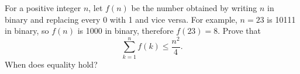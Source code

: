 For a positive integer \(n\), let \(f(n)\) be the number obtained by
writing \(n\) in binary and replacing every 0 with 1 and vice
versa. For example, \(n=23\) is 10111 in binary, so \(f(n)\) is 1000 in
binary, therefore \(f(23) =8\). Prove that
\[\sum_{k=1}^n f(k) \leq \frac{n^2}{4}.\]
When does equality hold?